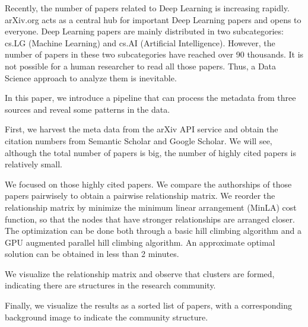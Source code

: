 
Recently, the number of papers related to Deep Learning is increasing rapidly.
arXiv.org acts as a central hub for important Deep Learning papers and opens to everyone.
Deep Learning papers are mainly distributed in two subcategories: cs.LG (Machine Learning) and cs.AI (Artificial Intelligence).
However, the number of papers in these two subcategories have reached over 90 thousands.
It is not possible for a human researcher to read all those papers.
Thus, a Data Science approach to analyze them is inevitable.

In this paper, we introduce a pipeline that can process the metadata from three sources and reveal some patterns in the data.

First, we harvest the meta data from the arXiv API service and obtain the citation numbers from Semantic Scholar and Google Scholar.
We will see, although the total number of papers is big, the number of highly cited papers is relatively small.

We focused on those highly cited papers.
We compare the authorships of those papers pairwisely to obtain a pairwise relationship matrix.
We reorder the relationship matrix by minimize the minimum linear arrangement (MinLA) cost function, so that the nodes that have stronger relationships are arranged closer.
The optimization can be done both through a basic hill climbing algorithm and a GPU augmented parallel hill climbing algorithm.
An approximate optimal solution can be obtained in less than 2 minutes.

We visualize the relationship matrix and observe that clusters are formed, indicating there are structures in the research community.

Finally, we visualize the results as a sorted list of papers, with a corresponding background image to indicate the community structure.

